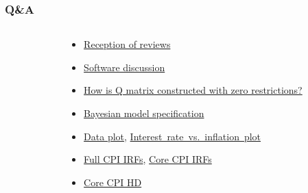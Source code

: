 \documentclass{beamer}
\begin{document}
\begin{frame}
	\frametitle{Q\&A}
	\label{qa}
	\begin{columns}
		\begin{column}{0.49\textwidth}
			\tableofcontents[hideothersubsections]
		\end{column}
		\begin{column}{0.49\textwidth}
			\begin{itemize}
				\item \hyperlink{reception}{Reception of reviews}
				\item \hyperlink{software}{Software discussion}
				\item \hyperlink{zero_q}{How is Q matrix constructed with zero restrictions?}
				\item \hyperlink{bvar}{Bayesian model specification}
				\item \hyperlink{time_series}{Data plot}, \hyperlink{intrate_cpi}{Interest~rate~vs.~inflation~plot}
				\item \hyperlink{fullirfs}{Full CPI IRFs},  \hyperlink{coreirfs}{Core CPI IRFs}
				\item \hyperlink{corehd}{Core CPI HD}
			\end{itemize}
		\end{column}
	\end{columns}
\end{frame}

\appendix
\end{document}
